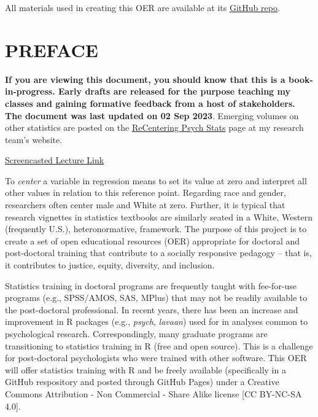 \documentclass[
  11pt,
]{book}
\begin{document}
All materials used in creating this OER are available at its \href{https://github.com/lhbikos/ReC_MultivModel}{GitHub repo}.

\hypertarget{preface}{%
\chapter*{PREFACE}\label{preface}}


\textbf{If you are viewing this document, you should know that this is a book-in-progress. Early drafts are released for the purpose teaching my classes and gaining formative feedback from a host of stakeholders. The document was last updated on 02 Sep 2023}. Emerging volumes on other statistics are posted on the \href{https://lhbikos.github.io/BikosRVT/ReCenter.html}{ReCentering Psych Stats} page at my research team's website.

\href{https://spu.hosted.panopto.com/Panopto/Pages/Viewer.aspx?id=c932455e-ef06-444a-bdca-acf7012d759a}{Screencasted Lecture Link}

To \emph{center} a variable in regression means to set its value at zero and interpret all other values in relation to this reference point. Regarding race and gender, researchers often center male and White at zero. Further, it is typical that research vignettes in statistics textbooks are similarly seated in a White, Western (frequently U.S.), heteronormative, framework. The purpose of this project is to create a set of open educational resources (OER) appropriate for doctoral and post-doctoral training that contribute to a socially responsive pedagogy -- that is, it contributes to justice, equity, diversity, and inclusion.

Statistics training in doctoral programs are frequently taught with fee-for-use programs (e.g., SPSS/AMOS, SAS, MPlus) that may not be readily available to the post-doctoral professional. In recent years, there has been an increase and improvement in R packages (e.g., \emph{psych}, \emph{lavaan}) used for in analyses common to psychological research. Correspondingly, many graduate programs are transitioning to statistics training in R (free and open source). This is a challenge for post-doctoral psychologists who were trained with other software. This OER will offer statistics training with R and be freely available (specifically in a GitHub respository and posted through GitHub Pages) under a Creative Commons Attribution - Non Commercial - Share Alike license {[}CC BY-NC-SA 4.0{]}.
\end{document}
